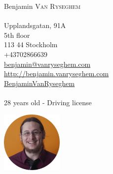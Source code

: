 \documentclass{curve}
\title{}
\begin{document}
\begin{minipage}{7cm}
\large
Benjamin \textsc{Van Ryseghem}\\
\normalsize
\\
Upplandsgatan, 91A\\
5th floor\\
113 44 Stockholm\\
+43702866639\\
\href{mailto:benjamin@vanryseghem.com}{benjamin@vanryseghem.com}\\
\href{http://benjamin.vanryseghem.com}{\underline{http://benjamin.vanryseghem.com}}\\
\href{https://github.com/BenjaminVanRyseghem}{ BenjaminVanRyseghem}\\
\\28 years old - Driving license
\end{minipage}
\hfill
\begin{minipage}{7cm}
  \begin{flushright}
  \includegraphics[height=3cm]{Moi}
  \end{flushright}
\end{minipage}
\maketitle

\end{document}

